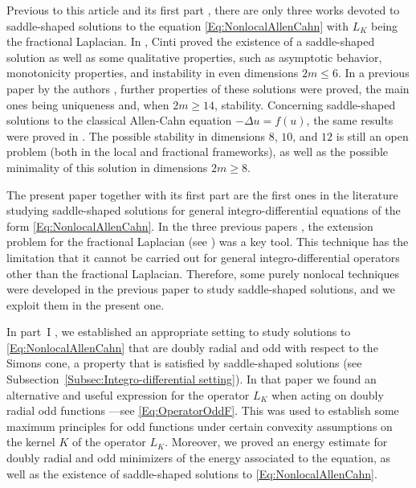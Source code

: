 \documentclass[12pt,reqno]{amsart}
\theoremstyle{definition}
\theoremstyle{remark}
\newcommand{\laplacian}{\Delta}
\numberwithin{equation}{section}
\begin{document}
Previous to this article and its first part \cite{FelipeSanz-Perela:IntegroDifferentialI}, there are only three works devoted to saddle-shaped solutions to the equation \eqref{Eq:NonlocalAllenCahn} with $L_K$ being the fractional Laplacian. In  \cite{Cinti-Saddle,Cinti-Saddle2}, Cinti proved the existence of a saddle-shaped solution as well as some qualitative properties, such as asymptotic behavior, monotonicity properties, and instability in even dimensions $2m\leq 6$. In a previous paper by the authors \cite{Felipe-Sanz-Perela:SaddleFractional}, further properties of these solutions were proved, the main ones being uniqueness and, when $2m\geq 14$, stability. Concerning saddle-shaped solutions to the classical Allen-Cahn equation $-\laplacian u = f(u)$, the same results were proved in \cite{DangFifePeletier, Schatzman, CabreTerraI,CabreTerraII, Cabre-Saddle}. The possible stability in dimensions $8$, $10$, and $12$ is still an open problem (both in the local and fractional frameworks), as well as the possible minimality of this solution in dimensions $2m \geq 8$.

The present paper together with its first part \cite{FelipeSanz-Perela:IntegroDifferentialI} are the first ones in the literature studying saddle-shaped solutions for general integro-differential equations of the form \eqref{Eq:NonlocalAllenCahn}. In the three previous papers \cite{Cinti-Saddle, Cinti-Saddle2, Felipe-Sanz-Perela:SaddleFractional}, the extension problem for the fractional Laplacian (see \cite{CaffarelliSilvestre}) was a key tool. This technique has the limitation that it cannot be carried out for general integro-differential operators other than the fractional Laplacian. Therefore, some purely nonlocal techniques were developed in the previous paper \cite{FelipeSanz-Perela:IntegroDifferentialI} to study saddle-shaped solutions, and we exploit them in the present one.

In part~I \cite{FelipeSanz-Perela:IntegroDifferentialI}, we established an appropriate setting to study solutions to \eqref{Eq:NonlocalAllenCahn} that are doubly radial and odd with respect to the Simons cone, a property that is satisfied by saddle-shaped solutions (see Subsection~\ref{Subsec:Integro-differential setting}). In that paper we found an alternative and useful expression for the operator $L_K$ when acting on doubly radial odd functions ---see \eqref{Eq:OperatorOddF}. This was used to establish some maximum principles for odd functions under certain convexity assumptions on the kernel $K$ of the operator $L_K$. Moreover, we proved an energy estimate for doubly radial and odd minimizers of the energy associated to the equation, as well as the existence of saddle-shaped solutions to \eqref{Eq:NonlocalAllenCahn}.
\end{document}

